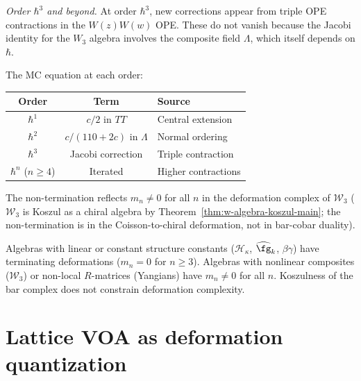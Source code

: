 \begin{computation}
\emph{Order $\hbar^3$ and beyond.}
At order $\hbar^3$, new corrections appear from triple OPE
contractions in the $W(z)W(w)$ OPE. These do not vanish
because the Jacobi identity for the $W_3$ algebra involves
the composite field $\Lambda$, which itself depends on $\hbar$.

The MC equation at each order:
\begin{center}
\renewcommand{\arraystretch}{1.2}
\begin{tabular}{c|cl}
Order & Term & Source \\
\hline
$\hbar^1$ & $c/2$ in $TT$ & Central extension \\
$\hbar^2$ & $c/(110+2c)$ in $\Lambda$ & Normal ordering \\
$\hbar^3$ & Jacobi correction & Triple contraction \\
$\hbar^n$ ($n \geq 4$) & Iterated & Higher contractions
\end{tabular}
\end{center}

The non-termination reflects $m_n \neq 0$ for all $n$ in the deformation complex of $\mathcal{W}_3$ ($\mathcal{W}_3$ is Koszul as a chiral algebra by Theorem~\ref{thm:w-algebra-koszul-main}; the non-termination is in the Coisson-to-chiral deformation, not in bar-cobar duality).
\end{computation}

\begin{remark}
\label{rem:deformation-complexity}
Algebras with linear or constant structure constants ($\mathcal{H}_\kappa$, $\widehat{\fg}_k$, $\beta\gamma$) have terminating deformations ($m_n = 0$ for $n \geq 3$). Algebras with nonlinear composites ($\mathcal{W}_3$) or non-local $R$-matrices (Yangians) have $m_n \neq 0$ for all $n$. Koszulness of the bar complex does not constrain deformation complexity.
\end{remark}


\section{Lattice VOA as deformation quantization}
\label{sec:lattice-dq}

